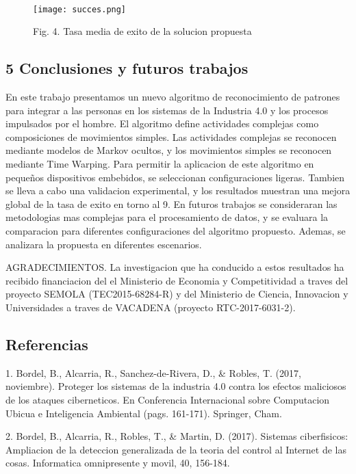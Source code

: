 \documentclass{paper}
\begin{document}
\ \begin{figure}[H]
    \centering
    \texttt{[image: succes.png]}
    \caption{Fig. 4. Tasa media de exito de la solucion propuesta}
    \label{fig:my_label}
\end{figure}



\subsection*{ 5  Conclusiones y futuros trabajos}

En este trabajo presentamos un nuevo algoritmo de reconocimiento de patrones para integrar a las personas en los sistemas de la Industria 4.0 y los procesos impulsados por el hombre. El algoritmo define actividades complejas
como composiciones de movimientos simples. Las actividades complejas se reconocen mediante modelos de Markov ocultos, y los movimientos simples se reconocen mediante Time Warping. Para permitir la aplicacion de este algoritmo en pequeños dispositivos embebidos, se seleccionan configuraciones ligeras. Tambien se lleva a cabo una validacion experimental, y los resultados muestran una mejora global de la tasa de exito en torno al 9.
En futuros trabajos se consideraran las metodologias mas complejas para el procesamiento de datos, y se evaluara la comparacion para diferentes configuraciones del algoritmo propuesto. Ademas, se analizara la propuesta en diferentes escenarios.

AGRADECIMIENTOS. La investigacion que ha conducido a estos resultados ha recibido financiacion del el Ministerio de Economia y Competitividad a traves del proyecto SEMOLA (TEC2015-68284-R) y del Ministerio de Ciencia, Innovacion y Universidades a traves de VACADENA (proyecto RTC-2017-6031-2).


\subsection*{Referencias}

\bigskip
\bigskip

1. Bordel, B., Alcarria, R., Sanchez-de-Rivera, D., & Robles, T. (2017, noviembre). Proteger los sistemas de la industria 4.0 contra los efectos maliciosos de los ataques ciberneticos. En
Conferencia Internacional sobre Computacion Ubicua e Inteligencia Ambiental (pags. 161-171). Springer, Cham.

\bigskip
\bigskip

 2. Bordel, B., Alcarria, R., Robles, T., & Martin, D. (2017). Sistemas ciberfisicos:
Ampliacion de la deteccion generalizada de la teoria del control al Internet de las cosas. Informatica omnipresente y movil, 40, 156-184.
\end{document}
